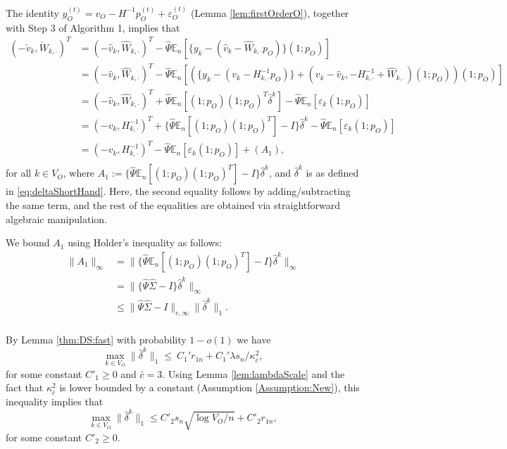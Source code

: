 \documentclass[opre,nonblindrev]{informs3} %
\def\En{{\mathbb{E}_n}}
\def\Hinvkdot{H^{-1}_{k,\cdot}}
\begin{document}
\begin{APPENDIX}{}
The identity $y_O^{(t)} = v_O - H^{-1}p_O^{(t)}+\varepsilon_O^{(t)}$  (Lemma \ref{lem:firstOrderO}),
together with Step 3 of Algorithm 1, implies that
\begin{equation}\label{eq:initialDiffThm1}
\begin{aligned}
(-\check v_k, \check W_{k,\cdot})^T & = (-\hat v_k, \hat W_{k,\cdot})^T -  \hat \Psi \En[\{y_k - (\hat v_k-\hat W_{k,\cdot} p_O)\}(1;p_O)]\\
& = (-\hat v_k, \hat W_{k,\cdot})^T -  \hat \Psi \En
\left[
\left(
\{y_k - ( v_k- \Hinvkdot p_O)\}
+ (v_k-\hat{v}_k,- \Hinvkdot + \hat{W}_{k,\cdot})(1;p_O)
\right)
(1;p_O) \right]
\\
& = (-\hat v_k, \hat W_{k,\cdot})^T +  \hat \Psi \En[(1;p_O)(1;p_O)^T \hat\delta^k] -  \hat \Psi \En[\varepsilon_k(1;p_O)]\\
& = (-v_k, H^{-1}_{k,\cdot})^T +  \{\hat \Psi \En[(1;p_O)(1;p_O)^T]-I\}\hat\delta^k - \hat \Psi\En[\varepsilon_k(1;p_O)]\\
& = (-v_k, H^{-1}_{k,\cdot})^T -  \hat \Psi\En[\varepsilon_k(1;p_O)] + (A_1),\\
\end{aligned}
\end{equation}
for all $k\in V_O$,
where $A_1:=  \{\hat \Psi \En[(1;p_O)(1;p_O)^T]-I\}\hat\delta^k$, 
and $\hat\delta^k$ is as defined in \eqref{eq:deltaShortHand}.
Here, the second equality follows by adding/subtracting the same term, and the rest of the equalities are obtained via straightforward algebraic manipulation.




We bound $A_1$ using Holder's inequality as follows:
\begin{equation}\label{eq:boundA1}
\begin{aligned}
\|A_1\|_\infty & = \|\{\hat \Psi \En[(1;p_O)(1;p_O)^T]-I\}\hat\delta^k\|_\infty \\
& = \|\{\hat \Psi \hat \Sigma-I\}\hat\delta^k\|_{\infty}\\
& \leq \|\hat \Psi \hat \Sigma-I\|_{e,\infty} \|\hat\delta^k\|_1.\\
\end{aligned}
\end{equation}



By Lemma \ref{thm:DS:fast} with probability $1-o(1)$  we have 
$$\max_{k\in V_O} \|\hat\delta^k\|_1
\leq \ C_1' r_{1n} + C_1' \lambda s_n/\kappa^2_{\bar c}
,$$
for some constant $C'_1 \geq 0$ and $\bar c=3$.
Using
Lemma \ref{lem:lambdaScale} and
the fact that $\kappa^2_{\bar c}$ is lower bounded by a constant
(Assumption \ref{Assumption:New}), this inequality implies that
$$\max_{k\in V_O} \|\hat\delta^k\|_1
\leq C'_2 s_n\sqrt{\log V_O/n} + C'_2r_{1n},$$
for some constant $C'_2 \geq 0$.


\end{APPENDIX}
\end{document}
